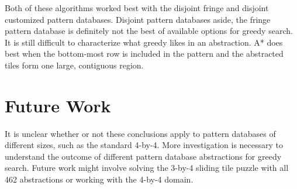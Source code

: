 \documentclass[letterpaper]{article}
\begin{document}
Both of these algorithms worked best with the disjoint fringe and disjoint customized pattern databases.  Disjoint pattern databases aside, the fringe pattern database is definitely not the best of available options for greedy search.  It is still difficult to characterize what greedy likes in an abstraction.  A* does best when the bottom-most row is included in the pattern and the abstracted tiles form one large, contiguous region.

\section{Future Work}

It is unclear whether or not these conclusions apply to pattern databases of different sizes, such as the standard 4-by-4.  More investigation is necessary to understand the outcome of different pattern database abstractions for greedy search.  Future work might involve solving the 3-by-4 sliding tile puzzle with all 462 abstractions or working with the 4-by-4 domain.





\end{document}
